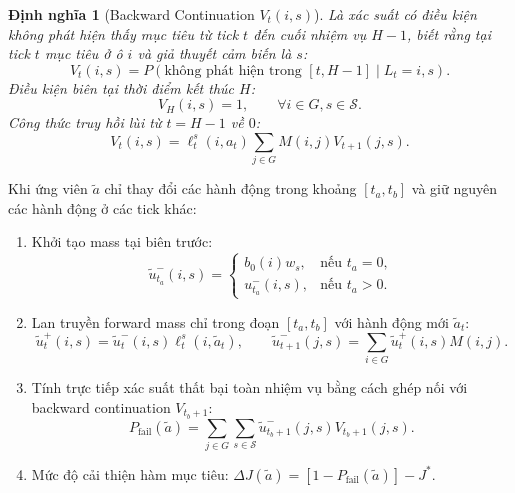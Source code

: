 \documentclass[12pt,a4paper]{article}
\newtheorem{definition}{Định nghĩa}
\begin{document}
\begin{definition}[Backward Continuation $V_t(i,s)$]
Là xác suất có điều kiện không phát hiện thấy mục tiêu từ tick $t$ đến cuối nhiệm vụ $H-1$, biết rằng tại tick $t$ mục tiêu ở ô $i$ và giả thuyết cảm biến là $s$:
\begin{equation}
V_t(i,s) = P(\text{không phát hiện trong } [t, H-1] \mid L_t = i, s).
\end{equation}
Điều kiện biên tại thời điểm kết thúc $H$:
\begin{equation}
V_H(i,s) = 1, \qquad \forall i \in G, s \in \mathcal{S}.
\end{equation}
Công thức truy hồi lùi từ $t = H-1$ về $0$:
\begin{equation}
V_t(i,s) = \ell_t^s(i, a_t) \sum_{j\in G} M(i,j) V_{t+1}(j,s).
\end{equation}
\end{definition}

Khi ứng viên $\tilde a$ chỉ thay đổi các hành động trong khoảng $[t_a, t_b]$ và giữ nguyên các hành động ở các tick khác:
\begin{enumerate}
    \item Khởi tạo mass tại biên trước:
    \begin{equation}
    \tilde u_{t_a}^-(i,s) = \begin{cases} b_0(i)w_s, & \text{nếu } t_a = 0, \\ u_{t_a}^-(i,s), & \text{nếu } t_a > 0. \end{cases}
    \end{equation}
    \item Lan truyền forward mass chỉ trong đoạn $[t_a, t_b]$ với hành động mới $\tilde a_t$:
    \begin{equation}
    \tilde u_t^+(i,s) = \tilde u_t^-(i,s)\ell_t^s(i, \tilde a_t),\qquad
    \tilde u_{t+1}^-(j,s) = \sum_{i\in G}\tilde u_t^+(i,s)M(i,j).
    \end{equation}
    \item Tính trực tiếp xác suất thất bại toàn nhiệm vụ bằng cách ghép nối với backward continuation $V_{t_b+1}$:
    \begin{equation}
    P_{\mathrm{fail}}(\tilde a) = \sum_{j\in G}\sum_{s\in\mathcal{S}} \tilde u_{t_b+1}^-(j,s) V_{t_b+1}(j,s).
    \label{eq:fast_eval}
    \end{equation}
    \item Mức độ cải thiện hàm mục tiêu: $\Delta J(\tilde a) = \left[ 1 - P_{\mathrm{fail}}(\tilde a) \right] - J^*$.
\end{enumerate}
\end{document}
